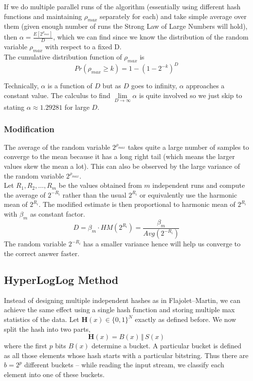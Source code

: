 If we do multiple parallel runs of the algorithm (essentially using different hash functions and 
maintaining $\rho_{max}$ separately for each) and take simple average over them 
(given enough number of runs the Strong Law of Large Numbers will hold), 
then $\alpha=\frac{E[2^{\rho_{max}}]}{D}$, which we can find since we know the distribution of the random 
variable $\rho_{max}$ with respect to a fixed D. \\

\noindent The cumulative distribution function of $\rho_{max}$ is
\[
Pr(\rho_{max} \ge k) = 1 - (1-2^{-k})^D
\]


\noindent Technically, $\alpha$ is a function of $D$ but as $D$ goes to infinity, $\alpha$ approaches a constant value. 
The calculus to find $\lim\limits_{D\to\infty}\alpha$ is quite involved so we just skip to stating 
$\alpha \approx 1.29281$ for large $D$.

\subsubsection*{Modification}
The average of the random variable $2^{\rho_{max}}$ takes quite a large number of samples 
to converge to the mean because it has a long right tail (which means the larger values skew the mean a lot). 
This can also be observed by the large variance of the random variable $2^{\rho_{max}}$.\\


\noindent Let \(R_1,R_2,\dots,R_m\) be the values obtained from \(m\) independent runs and compute the 
average of $2^{-R_i}$ rather than the usual $2^{R_i}$ or equivalently use the harmonic mean of $2^{R_i}$. The 
modified estimate is then proportional to harmonic mean
of $2^{R_i}$ with \(\beta_m\) as constant factor.
\[
D = \beta_m \cdot HM(2^{R_i}) = \frac{\beta_m}{Avg(2^{-R_i})} 
\]
The random variable $2^{-R_i}$ has a smaller variance hence will help us converge to the correct answer faster.\\


\subsection{HyperLogLog Method}
Instead of designing multiple independent hashes as in Flajolet–Martin, we can achieve the 
same effect using a single hash function and storing multiple max statistics of the data. 
Let $\mathbf H(x)\in\{0,1\}^{N}$ exactly as defined before. We now split the hash into two parts,
\[
\mathbf H(x)=B(x)\,\Vert\,S(x)
\]
where the first \(p\) bits \(B(x)\) determine a bucket. A particular bucket
is defined as all those elements whose hash starts with a particular bitstring. Thus there are $b=2^p$ different
buckets -- while reading the input stream, we classify each element into one of these buckets.\\


